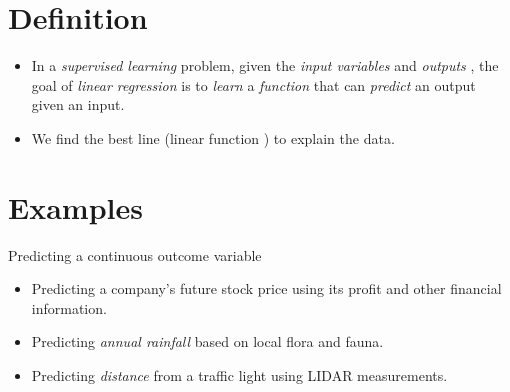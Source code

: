 \documentclass[
	title={Linear Regression}
]{cs584notes}
\begin{document}

\tableofcontents

\section{Definition}\label{sec:definition}
\begin{itemize}
	\item In a \emph{supervised learning} problem, given the \emph{input variables}  and \emph{outputs} , the goal of \emph{linear regression} is to \emph{learn} a \emph{function} that can \emph{predict} an output given an input.
	\item We find the best line (linear function ) to explain the data.
\end{itemize}

\section{Examples}\label{sec:examples}
Predicting a continuous outcome variable
\begin{itemize}
	\item Predicting a company's future stock price using its profit and other financial information.
	\item Predicting \emph{annual rainfall} based on local flora and fauna.
	\item Predicting \emph{distance} from a traffic light using LIDAR measurements.
\end{itemize}
\end{document}
